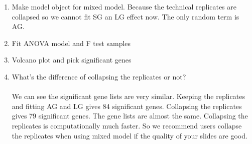 \begin{enumerate}
\item Make model object for mixed model. Because the technical replicates
are collapsed so we cannot fit SG an LG effect now. The only random term
is AG.\\

\item Fit ANOVA model and F test samples \\

\item Volcano plot and pick significant genes\\

\item What's the difference of collapsing the replicates or not?\\
\\
We can see the significant gene lists are very similar. Keeping
the replicates and fitting AG and LG gives 84 significant genes.
Collapsing the replicates gives 79 significant genes. The gene 
lists are almost the same. Collapsing the replicates is computationally
much faster. So we recommend users collapse the replicates when
using mixed model if the quality of your slides are good. 

\end{enumerate}


